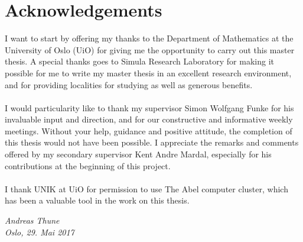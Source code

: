 \chapter*{Acknowledgements}
I want to start by offering my thanks to the Department of Mathematics at the University of Oslo (UiO) for giving me the opportunity to carry out this master thesis. A special thanks goes to Simula Research Laboratory for making it possible for me to write my master thesis in an excellent research environment, and for providing localities for studying as well as generous benefits.
\\
\\
I would particularity like to thank my supervisor Simon Wolfgang Funke for his invaluable input and direction, and for our constructive and informative weekly meetings. Without your help, guidance and positive attitude, the completion of this thesis would not have been possible. I appreciate the remarks and comments offered by my secondary supervisor Kent Andre Mardal, especially for his contributions at the beginning of this project.
\\
\\
I thank UNIK at UiO for permission to use The Abel computer cluster, which has been a valuable tool in the work on this thesis.
\begin{flushright}
\textit{
Andreas Thune
\\
Oslo, 29. Mai 2017}
\end{flushright}
